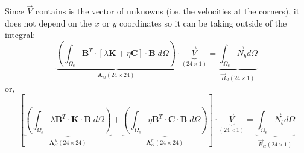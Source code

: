 Since $\vec V$ contains is the vector of unknowns (i.e. the velocities at the corners), 
it does not depend on the $x$ or $y$ coordinates
so it can be taking outside of the integral:
\[
\underbrace{
\left(\int_{\Omega_e} {\bm B}^T \cdot [ \lambda {\bm K} + \eta {\bm C} ] \cdot {\bm B} \;  d\Omega \right) 
}_{\bm A_{el}(24 \times 24)}
\cdot 
\underbrace{
{\vec V}
}_{(24\times 1)}
=
\underbrace{
\int_{\Omega_e} {\vec N}_b d\Omega 
}_{\vec B_{el} (24\times 1)}
\]
or, 
\[
\left[
\underbrace{
\left(\int_{\Omega_e} \lambda {\bm B}^T \cdot {\bm K} \cdot {\bm B} \; d\Omega \right) 
}_{\bm A_{el}^\lambda(24 \times 24)}
+
\underbrace{
\left(\int_{\Omega_e}  \eta {\bm B}^T \cdot {\bm C}  \cdot {\bm B} \;  d\Omega \right) 
}_{\bm A_{el}^\eta(24 \times 24)}
\right]
\cdot 
\underbrace{
{\vec V}
}_{(24\times 1)}
=
\underbrace{
\int_{\Omega_e} {\vec N}_b d\Omega 
}_{\vec B_{el} (24\times 1)}
\]

\Literature \cite{dhhu86}


